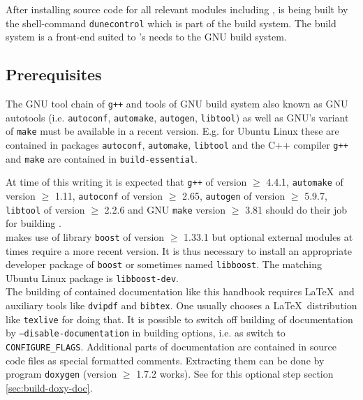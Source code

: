 After installing source code for all relevant \Dune modules including \Dumux, \Dune is being built by the shell-command \texttt{dunecontrol} which is part of the \Dune build system. The \Dune build system is a front-end suited to \Dune's needs to the GNU build system.

\subsection{Prerequisites} \label{sec:prerequisites}
The GNU tool chain of \texttt{g++}  and tools of GNU build system \cite{GNU-BS} also known as GNU autotools
(i.e. \texttt{autoconf}, \texttt{automake}, \texttt{autogen}, \texttt{libtool}) as well as GNU's variant of \texttt{make}
must be available in a recent version. E.g. for Ubuntu Linux these are contained in
packages \texttt{autoconf}, \texttt{automake}, \texttt{libtool}
and the C++ compiler \texttt{g++} and \texttt{make} are contained in \texttt{build-essential}.

At time of this writing it is expected that \texttt{g++} of version $\geqslant$ 4.4.1, \texttt{automake} of version $\geqslant$ 1.11,
\texttt{autoconf} of version $\geqslant$ 2.65, \texttt{autogen} of version $\geqslant$ 5.9.7,  \texttt{libtool} of version $\geqslant$ 2.2.6
and GNU \texttt{make} version $\geqslant$ 3.81 should do their job for building \Dumux.\\

\Dumux makes use of library \texttt{boost} of version $\geqslant$ 1.33.1 but optional external modules at times require a more recent version. 
It is thus necessary to install an appropriate developer package of \texttt{boost}
or sometimes named \texttt{libboost}. The matching Ubuntu Linux package is \texttt{libboost-dev}. \\

The building of contained documentation like this handbook requires \LaTeX\  and auxiliary tools
like \texttt{dvipdf} and \texttt{bibtex}. One usually chooses a \LaTeX\  distribution like \texttt{texlive} for doing that.
It is possible to switch off building of documentation by \texttt{--disable-documentation} in building options, i.e. as switch to \texttt{CONFIGURE\_FLAGS}.
Additional parts of documentation are contained in source code files as special formatted comments.
Extracting them can be done by program \texttt{doxygen} (version $\geqslant$ 1.7.2 works). See for this optional step section \ref{sec:build-doxy-doc}.\\

